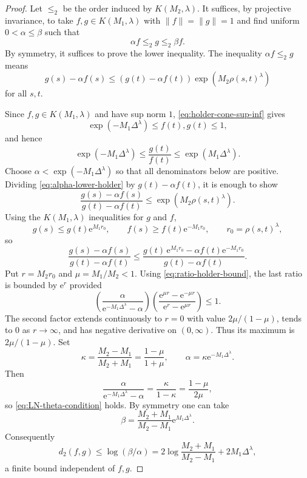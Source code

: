 \documentclass[11pt]{article}
\newcommand{\e}{\mathrm{e}}
\begin{document}
\begin{proof}
Let \(\le_2\) be the order induced by \(K(M_2,\lambda)\).  It suffices, by projective invariance, to take \(f,g\in K(M_1,\lambda)\) with \(\|f\|=\|g\|=1\) and find uniform \(0<\alpha\le\beta\) such that
\[
  \alpha f\le_2 g\le_2 \beta f.
\]
By symmetry, it suffices to prove the lower inequality.  The inequality \(\alpha f\le_2 g\) means
\begin{equation}
  g(s)-\alpha f(s)
  \le (g(t)-\alpha f(t))\exp(M_2\rho(s,t)^\lambda)
  \label{eq:alpha-lower-holder}
\end{equation}
for all \(s,t\).

Since \(f,g\in K(M_1,\lambda)\) and have sup norm \(1\), \eqref{eq:holder-cone-sup-inf} gives
\[
  \exp(-M_1\Delta^\lambda)
  \le f(t),g(t)
  \le1,
\]
and hence
\begin{equation}
  \exp(-M_1\Delta^\lambda)
  \le \frac{g(t)}{f(t)}
  \le \exp(M_1\Delta^\lambda).
  \label{eq:ratio-holder-bound}
\end{equation}
Choose \(\alpha<\exp(-M_1\Delta^\lambda)\) so that all denominators below are positive.  Dividing \eqref{eq:alpha-lower-holder} by \(g(t)-\alpha f(t)\), it is enough to show
\[
  \frac{g(s)-\alpha f(s)}{g(t)-\alpha f(t)}
  \le \exp(M_2\rho(s,t)^\lambda).
\]
Using the \(K(M_1,\lambda)\) inequalities for \(g\) and \(f\),
\[
  g(s)\le g(t)\e^{M_1 r_0},
  \qquad
  f(s)\ge f(t)\e^{-M_1 r_0},
  \qquad r_0=\rho(s,t)^\lambda,
\]
so
\[
  \frac{g(s)-\alpha f(s)}{g(t)-\alpha f(t)}
  \le
  \frac{g(t)\,\e^{M_1r_0}-\alpha f(t)\e^{-M_1r_0}}{g(t)-\alpha f(t)}.
\]
Put \(r=M_2r_0\) and \(\mu=M_1/M_2<1\).  Using \eqref{eq:ratio-holder-bound}, the last ratio is bounded by \(\e^r\) provided
\begin{equation}
  \left(\frac{\alpha}{\e^{-M_1\Delta^\lambda}-\alpha}\right)
  \left(\frac{\e^{\mu r}-\e^{-\mu r}}{\e^r-\e^{\mu r}}\right)
  \le1.
  \label{eq:LN-theta-condition}
\end{equation}
The second factor extends continuously to \(r=0\) with value \(2\mu/(1-\mu)\), tends to \(0\) as \(r\to\infty\), and has negative derivative on \((0,\infty)\).  Thus its maximum is \(2\mu/(1-\mu)\).
Set
\[
  \kappa=\frac{M_2-M_1}{M_2+M_1}=\frac{1-\mu}{1+\mu},
  \qquad
  \alpha=\kappa\e^{-M_1\Delta^\lambda}.
\]
Then
\[
  \frac{\alpha}{\e^{-M_1\Delta^\lambda}-\alpha}
  =\frac{\kappa}{1-\kappa}
  =\frac{1-\mu}{2\mu},
\]
so \eqref{eq:LN-theta-condition} holds.  By symmetry one can take
\[
  \beta=\frac{M_2+M_1}{M_2-M_1}\e^{M_1\Delta^\lambda}.
\]
Consequently
\[
  d_2(f,g)\le \log(\beta/\alpha)
  =2\log\frac{M_2+M_1}{M_2-M_1}+2M_1\Delta^\lambda,
\]
a finite bound independent of \(f,g\).
\end{proof}
\end{document}
